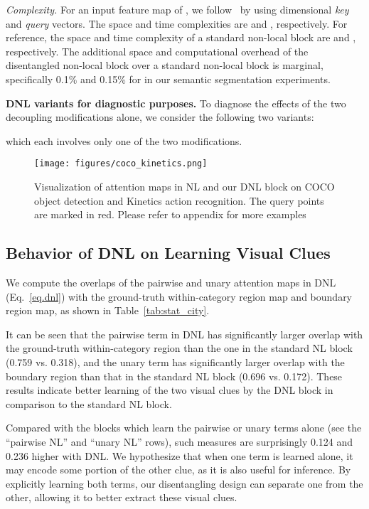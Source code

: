 \documentclass[runningheads]{llncs}
\begin{document}
\noindent \emph{Complexity.} For an input feature map of , we follow~\cite{wang2018non} by using  dimensional \emph{key} and \emph{query} vectors. The space and time complexities are  and , respectively. For reference, the space and time complexity of a standard non-local block are  and , respectively. The additional space and computational overhead of the disentangled non-local block over a standard non-local block is marginal, specifically 0.1\% and 0.15\% for  in our semantic segmentation experiments.


\noindent \textbf{DNL variants for diagnostic purposes.} To diagnose the effects of the two decoupling modifications alone, we consider the following two variants:
\begin{small}

\end{small}which each involves only one of the two modifications.

\begin{figure*}[t]
    \centering
    \texttt{[image: figures/coco\_kinetics.png]}
    \vspace{-10pt}
    \caption{Visualization of attention maps in NL and our DNL block on COCO object detection and Kinetics action recognition. The query points are marked in red. Please refer to appendix for more examples}
    \label{fig:vis-coco-kinetics}
    \vspace{-15pt}
\end{figure*}

\subsection{Behavior of DNL on Learning Visual Clues }
\label{sec:behavior}
 We compute the overlaps of the pairwise and unary attention maps in DNL (Eq.~\ref{eq.dnl}) with the ground-truth within-category region map and boundary region map, as shown in Table~\ref{tab:stat_city}.

It can be seen that the pairwise term in DNL has significantly larger overlap with the ground-truth within-category region than the one in the standard NL block (0.759 vs. 0.318), and the unary term has significantly larger overlap with the boundary region than that in the standard NL block (0.696 vs. 0.172). These results indicate better learning of the two visual clues by the DNL block in comparison to the standard NL block.

Compared with the blocks which learn the pairwise or unary terms alone (see the ``pairwise NL'' and ``unary NL'' rows), such measures are surprisingly 0.124 and 0.236 higher with DNL. We hypothesize that when one term is learned alone, it may encode some portion of the other clue, as it is also useful for inference. By explicitly learning both terms, our disentangling design can separate one from the other, allowing it to better extract these visual clues.
\end{document}
